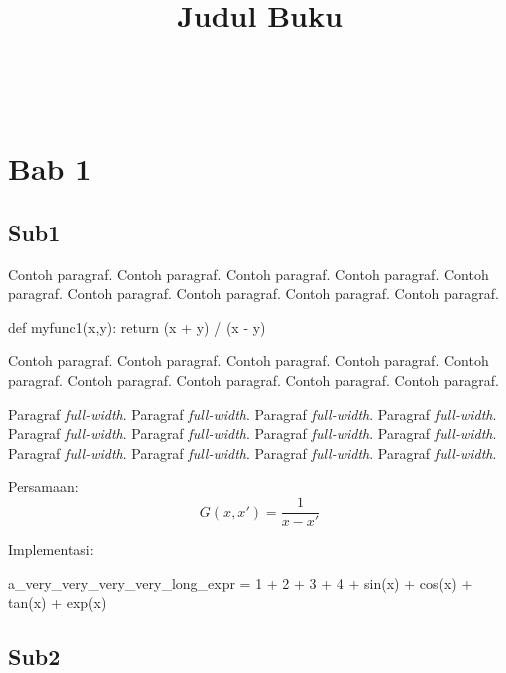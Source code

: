 \documentclass[a4paper,twoside,bahasa,nobib]{tufte-book}
\title{Judul Buku}
\author[Fadjar \& Mariya]{\noindent{Fadjar Fathurrahman} \\[3mm]
\noindent{Mariya Al Qibtiya Nasution} \\[3mm]}
\begin{document}
\maketitle

\frontmatter

\tableofcontents
\listoffigures
\listoftables

\mainmatter

\chapter{Bab 1}

\section{Sub1}

Contoh paragraf. Contoh paragraf. Contoh paragraf. Contoh paragraf.
Contoh paragraf. Contoh paragraf. Contoh paragraf. Contoh paragraf.
Contoh paragraf.

\begin{pythoncode}
def myfunc1(x,y):
    return (x + y) / (x - y)
\end{pythoncode}

Contoh paragraf. Contoh paragraf. Contoh paragraf. Contoh paragraf.
Contoh paragraf. Contoh paragraf. Contoh paragraf. Contoh paragraf.
Contoh paragraf.

\begin{fullwidth}
Paragraf \emph{full-width}. Paragraf \emph{full-width}. Paragraf \emph{full-width}.
Paragraf \emph{full-width}. Paragraf \emph{full-width}. Paragraf \emph{full-width}.
Paragraf \emph{full-width}. Paragraf \emph{full-width}. Paragraf \emph{full-width}.
Paragraf \emph{full-width}. Paragraf \emph{full-width}. Paragraf \emph{full-width}.
\end{fullwidth}


Persamaan:
\begin{equation}
G(x,x') = \frac{1}{x - x'}
\end{equation}


Implementasi:

\begin{fullwidth}
\begin{pythoncode}
a_very_very_very_very_long_expr = 1 + 2 + 3 + 4 + sin(x) + cos(x) + tan(x) + exp(x)
\end{pythoncode}
\end{fullwidth}

\section{Sub2}
\end{document}
